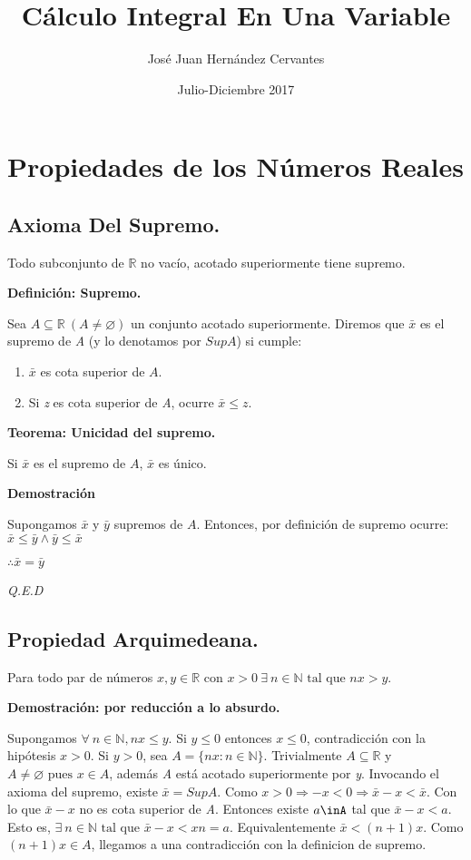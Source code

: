\documentclass{book}
\title{Cálculo Integral En Una Variable}
\author{José Juan Hernández Cervantes}
\date{Julio-Diciembre 2017}
\begin{document}
\maketitle
\chapter{Propiedades de los Números Reales}
\section{Axioma Del Supremo.}
Todo subconjunto de $\mathbb{R}$ no vacío, acotado superiormente tiene supremo.

\textbf{Definición: Supremo.}

Sea $A \subseteq \mathbb{R} \ (A \neq \varnothing)$ un conjunto acotado superiormente.
Diremos que $\bar{x}$ es el supremo de \textit{A} (y lo denotamos por $SupA$) si cumple:
\begin{enumerate}[1.]
\item $\bar{x}$  es cota superior de $A$.
\item Si \textit{z} es cota superior de \textit{A}, ocurre $\bar{x}\le z$.
\end{enumerate}
\textbf{Teorema: Unicidad del supremo.}

Si $\bar{x}$ es el supremo de $A$, $\bar{x}$ es único.

\textbf{Demostración}

Supongamos $\bar{x}$ y $\bar{y}$ supremos de $A$. Entonces, por definición de supremo ocurre:
$\bar{x}\le\bar{y}\land\bar{y}\le\bar{x}$

$\therefore \bar{x}=\bar{y}$

\textit{Q.E.D}

\section{Propiedad Arquimedeana.}

Para todo par de números $x,y\in \mathbb{R}\mbox{ con }x> 0 \ \exists \ n\in\mathbb{N}\mbox{ tal que }nx> y$.

\textbf{Demostración: por reducción a lo absurdo.}

Supongamos $\forall \ n\in\mathbb{N},nx\le{y}$.
Si $y\le{0}$ entonces $x\le{0}$, contradicción con la hipótesis $x>0$.
Si $y>0$, sea $A=\lbrace nx:n\in{\mathbb{N}}\rbrace$.
Trivialmente $A\subseteq{\mathbb{R}}$ y $ A\neq \varnothing\mbox{ pues }x\in A$, además \textit{A} está acotado superiormente por \textit{y}.
Invocando el axioma del supremo, existe $\bar{x}=SupA$.
Como $x>0 \Rightarrow -x<0\Rightarrow \bar{x}-x<\bar{x}$.
Con lo que $\bar{x}-x$ no es cota superior de \textit{A}.
Entonces existe $a\inA$ tal que $\bar{x}-x<a$.
Esto es, $\exists \ n\in{\mathbb{N}}\mbox{ tal que }\bar{x}-x<xn=a$. Equivalentemente $\bar{x}<(n+1)x$.
Como $(n+1)x\in{A}$, llegamos a una contradicción con la definicion de supremo.
\end{document}
